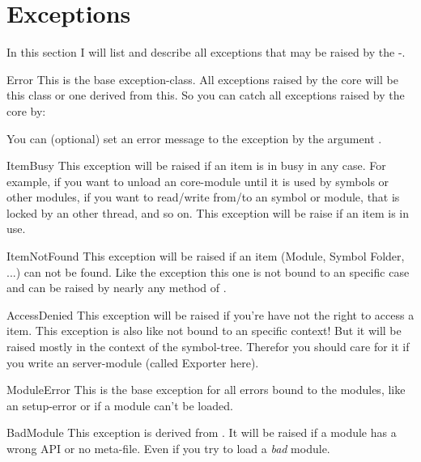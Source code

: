 \section{Exceptions}
In this section I will list and describe all exceptions that may be raised by 
the -. 

\begin{excclassdesc}{Error}{}
This is the base exception-class. All exceptions raised by the core will be
this class or one derived from this. So you can catch all exceptions raised
by the core by:

You can (optional) set an error message to the exception by the argument
.
\end{excclassdesc}

\begin{excclassdesc}{ItemBusy}{}
This exception will be raised if an item is in busy in any case. For example,
if you want to unload an core-module until it is used by symbols or other 
modules, if you want to read/write from/to an symbol or module, that is locked
by an other thread, and so on. 
This exception will be raise if an item is in use. 
\end{excclassdesc}

\begin{excclassdesc}{ItemNotFound}{}
This exception will be raised if an item (Module, Symbol Folder, ...) can not
be found. Like the exception  this one is not bound to an
specific case and can be raised by nearly any method of .
\end{excclassdesc}

\begin{excclassdesc}{AccessDenied}{}
This exception will be raised if you're have not the right to access a item.
This exception is also like  not bound to an specific 
context! But it will be raised mostly in the context of the symbol-tree. 
Therefor you should care for it if you write an server-module (called Exporter
here). 
\end{excclassdesc}

\begin{excclassdesc}{ModuleError}{}
This is the base exception for all errors bound to the modules, like an 
setup-error or if a module can't be loaded. 
\end{excclassdesc}

\begin{excclassdesc}{BadModule}{}
This exception is derived from . It will be raised if
a module has a wrong API or no meta-file. Even if you try to load a \emph{bad}
module. 
\end{excclassdesc}

